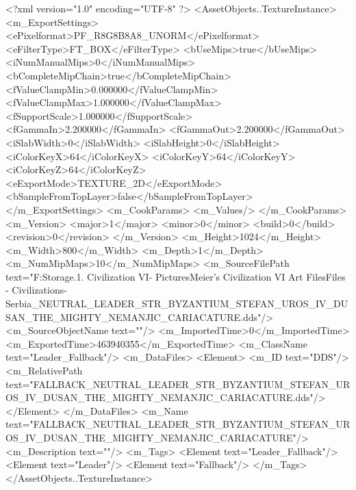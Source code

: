 <?xml version="1.0" encoding="UTF-8" ?>
<AssetObjects..TextureInstance>
	<m_ExportSettings>
		<ePixelformat>PF_R8G8B8A8_UNORM</ePixelformat>
		<eFilterType>FT_BOX</eFilterType>
		<bUseMips>true</bUseMips>
		<iNumManualMips>0</iNumManualMips>
		<bCompleteMipChain>true</bCompleteMipChain>
		<fValueClampMin>0.000000</fValueClampMin>
		<fValueClampMax>1.000000</fValueClampMax>
		<fSupportScale>1.000000</fSupportScale>
		<fGammaIn>2.200000</fGammaIn>
		<fGammaOut>2.200000</fGammaOut>
		<iSlabWidth>0</iSlabWidth>
		<iSlabHeight>0</iSlabHeight>
		<iColorKeyX>64</iColorKeyX>
		<iColorKeyY>64</iColorKeyY>
		<iColorKeyZ>64</iColorKeyZ>
		<eExportMode>TEXTURE_2D</eExportMode>
		<bSampleFromTopLayer>false</bSampleFromTopLayer>
	</m_ExportSettings>
	<m_CookParams>
		<m_Values/>
	</m_CookParams>
	<m_Version>
		<major>1</major>
		<minor>0</minor>
		<build>0</build>
		<revision>0</revision>
	</m_Version>
	<m_Height>1024</m_Height>
	<m_Width>800</m_Width>
	<m_Depth>1</m_Depth>
	<m_NumMipMaps>10</m_NumMipMaps>
	<m_SourceFilePath text="F:\Mod Storage\2.1. Civilization VI\Mods\Archive - Pictures\Sid Meier's Civilization VI Art Files\Art Files - Civilizations\Civilization - Serbia\FALLBACK_NEUTRAL_LEADER_STR_BYZANTIUM_STEFAN_UROS_IV_DUSAN_THE_MIGHTY_NEMANJIC_CARIACATURE.dds"/>
	<m_SourceObjectName text=""/>
	<m_ImportedTime>0</m_ImportedTime>
	<m_ExportedTime>463940355</m_ExportedTime>
	<m_ClassName text="Leader_Fallback"/>
	<m_DataFiles>
		<Element>
			<m_ID text="DDS"/>
			<m_RelativePath text="FALLBACK_NEUTRAL_LEADER_STR_BYZANTIUM_STEFAN_UROS_IV_DUSAN_THE_MIGHTY_NEMANJIC_CARIACATURE.dds"/>
		</Element>
	</m_DataFiles>
	<m_Name text="FALLBACK_NEUTRAL_LEADER_STR_BYZANTIUM_STEFAN_UROS_IV_DUSAN_THE_MIGHTY_NEMANJIC_CARIACATURE"/>
	<m_Description text=""/>
	<m_Tags>
		<Element text="Leader_Fallback"/>
		<Element text="Leader"/>
		<Element text="Fallback"/>
	</m_Tags>
</AssetObjects..TextureInstance>

